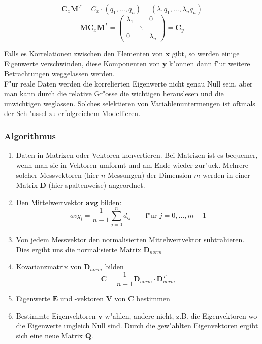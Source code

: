 \documentclass[german, 10pt, a4paper, twocolumn]{scrartcl}
\begin{document}
\begin{displaymath}
	\mathbf{C}_x \mathbf{M}^T = C_x \cdotp (q_1, \ldots, q_n) = (\lambda_1 q_1, \ldots, \lambda_n q_n)
\end{displaymath}
\begin{displaymath}
	\mathbf{M}\mathbf{C}_x\mathbf{M}^T = 	\left (
							\begin{array}{ccc}
								\lambda_1 &	&		0\\
								 &		\ddots &	\\
								 0 &		&		\lambda_n
							\end{array}
						\right ) = \mathbf{C}_y
\end{displaymath}

Falls es Korrelationen zwischen den Elementen von $\mathbf{x}$ gibt, so werden einige Eigenwerte verschwinden, diese Komponenten von $\mathbf{y}$ k"onnen dann f"ur weitere Betrachtungen weggelassen werden.\\

F"ur reale Daten werden die korrelierten Eigenwerte nicht genau Null sein, aber man kann durch die relative Gr"osse die wichtigen herauslesen und die unwichtigen weglassen. Solches selektieren von Variablenuntermengen ist oftmals der Schl"ussel zu erfolgreichem Modellieren.

\subsubsection{Algorithmus}

\begin{enumerate}
	\item Daten in Matrizen oder Vektoren konvertieren. Bei Matrizen ist es bequemer, wenn man sie in Vektoren umformt und am Ende wieder zur"uck. Mehrere solcher Messvektoren (hier $n$ Messungen) der Dimension $m$ werden in einer Matrix $\mathbf{D}$ (hier spaltenweise) angeordnet.
	\item Den Mittelwertvektor $\mathbf{avg}$ bilden: 
		\begin{displaymath}
			avg_i = \frac{1}{n-1}\sum^n_{j=0} d_{ij} \qquad \text{f"ur } j = 0, \ldots, m-1
		\end{displaymath}
	\item Von jedem Messvektor den normalisierten Mittelwertvektor subtrahieren. Dies ergibt uns die normalisierte Matrix $\mathbf{D}_{norm}$
	\item Kovarianzmatrix von $\mathbf{D}_{norm}$ bilden
		\begin{displaymath}
			\mathbf{C} = \frac{1}{n-1} \mathbf{D}_{norm} \cdotp \mathbf{D}_{norm}^T
		\end{displaymath}
	\item Eigenwerte $\mathbf{E}$ und -vektoren $\mathbf{V}$ von $\mathbf{C}$ bestimmen
	\item Bestimmte Eigenvektoren $\mathbf{v}$ w"ahlen, andere nicht, z.B. die Eigenvektoren wo die Eigenwerte ungleich Null sind. Durch die gew"ahlten Eigenvektoren ergibt sich eine neue Matrix $\mathbf{Q}$.
\end{enumerate}
\end{document}
